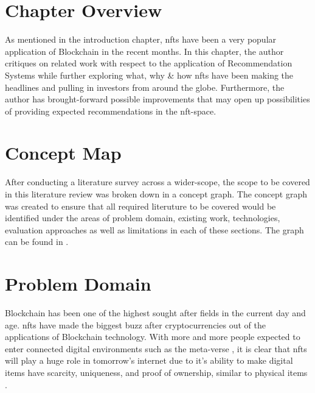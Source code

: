 



\section{Chapter Overview}
As mentioned in the introduction chapter, \gls{nft}s have been a very popular application of Blockchain in the recent months. In this chapter, the author critiques on related work with respect to the application of Recommendation Systems while further exploring what, why \& how \gls{nft}s have been making the headlines and pulling in investors from around the globe. Furthermore, the author has brought-forward possible improvements that may open up possibilities of providing expected recommendations in the \gls{nft}-space.

\section{Concept Map}
After conducting a literature survey across a wider-scope, the scope to be covered in this literature review was broken down in a concept graph. The concept graph was created to ensure that all required literuture to be covered would be identified under the areas of problem domain, existing work, technologies, evaluation approaches as well as limitations in each of these sections. The graph can be found in \textbf{}.


\section{Problem Domain}

Blockchain has been one of the highest sought after fields in the current day and age. \gls{nft}s have made the biggest buzz after cryptocurrencies out of the applications of Blockchain technology. With more and more people expected to enter connected digital environments such as the meta-verse \autocite{casey_newton_mark_2021}, it is clear that \gls{nft}s will play a huge role in tomorrow's internet \autocite{peter_allen_clark_what_2021} due to it's ability to make digital items have scarcity, uniqueness, and proof of ownership, similar to physical items \autocite{noauthor_non-fungible_nodate}.

